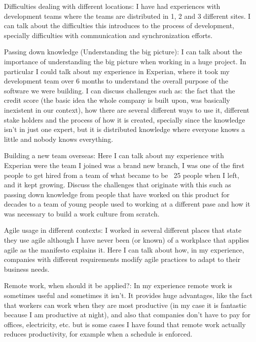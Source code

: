 \documentclass[12pt, letterpaper]{article}
\begin{document}
 

\cite{monperrus11} 

\cite{Newell06} 

\cite{Steinmacher12} 

\cite{Dagenais10} 

\cite{Razavi06} 

\cite{Whitworth06} 

 
 
Difficulties dealing with different locations: I have had experiences with development teams where the teams are distributed in 1, 2 and 3 different sites. I can talk about the difficulties this introduces to the process of development, specially difficulties with communication and synchronization efforts.

Passing down knowledge (Understanding the big picture): I can talk about the importance of understanding the big picture when working in a huge project. In particular I could talk about my experience in Experian, where it took my development team over 6 months to understand the overall purpose of the software we were building. I can discuss challenges such as: the fact that the credit score (the basic idea the whole company is built upon, was basically inexistent in our context), how there are several different ways to use it, different stake holders and the process of how it is created, specially since the knowledge isn't in just one expert, but it is distributed knowledge where everyone knows a little and nobody knows everything.

Building a new team overseas: Here I can talk about my experience with Experian were the team I joined was a brand new branch, I was one of the first people to get hired from a team of what became to be ~25 people when I left, and it kept growing. Discuss the challenges that originate with this such as passing down knowledge from people that have worked on this product for decades to a team of young people used to working at a different pase and how it was necessary to build a work culture from scratch.

Agile usage in different contexts: I worked in several different places that state they use agile although I have never been (or known) of a  workplace that applies agile as the manifesto explains it. Here I can talk about how, in my experience, companies with different requirements modify agile practices to adapt to their business needs.

Remote work, when should it be applied?: In my experience remote work is sometimes useful and sometimes it isn't. It provides huge advantages, like the fact that workers can work when they are most productive (in my case it is fantastic because I am productive at night), and also that companies don't have to pay for offices, electricity, etc. but is some cases I have found that remote work actually reduces productivity, for example when a schedule is enforced.
\end{document}

